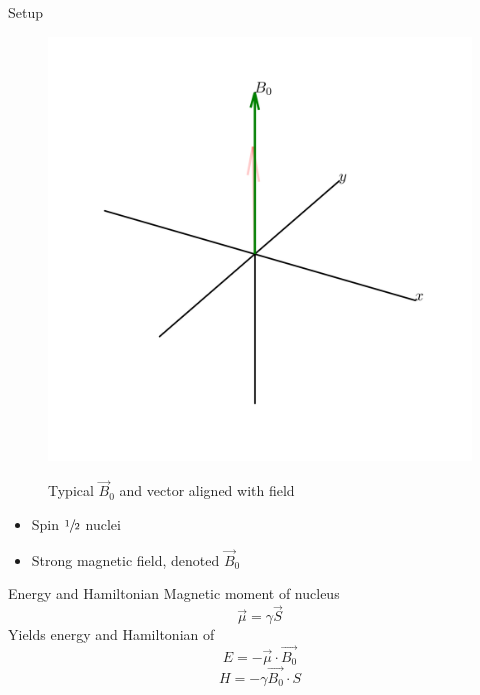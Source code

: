 \documentclass[aspectratio=169,xcolor=dvipsnames]{beamer}
\newcommand{\half}{$\sfrac{1}{2}$ }
\newcommand{\Bnot}{\vec{B}_0}
\begin{document}
\begin{frame}{Setup}
    

    \begin{minipage}{0.4\linewidth}
        \begin{figure}
            \centering
            \includegraphics[width = \linewidth]{setup.png}\\
            \caption{Typical $\Bnot$ and vector aligned with field}
        \end{figure}
    \end{minipage}
    \hfill
    \begin{minipage}{0.5\linewidth}
        \begin{itemize}
            \item Spin \half nuclei 
            \item Strong magnetic field, denoted $\Bnot$
        \end{itemize}
        \begin{block}{Energy and Hamiltonian}
            Magnetic moment of nucleus
            \begin{equation}
                \vec{\mu} = \gamma \vec{S}
            \end{equation}
            Yields energy and Hamiltonian of 
            \begin{equation}
                E = -\vec{\mu} \cdot \vec{B_0}
            \end{equation}
            \begin{equation}\label{eqn:base-hamiltonian}
                H = -\gamma \vec{B_0} \cdot S
            \end{equation}
        \end{block}
    \end{minipage}
    

\end{frame}
\end{document}
